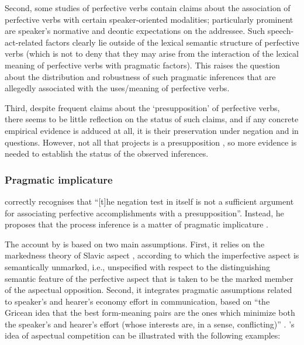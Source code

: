  Second, some studies of perfective verbs \citep[here represented by][]{Paducheva:96, Romanova:06} contain claims about the association of perfective verbs with certain speaker-oriented modalities; particularly prominent are speaker's normative and deontic expectations on the addressee. Such speech-act-related factors clearly lie outside of the lexical semantic structure of perfective verbs (which is not to deny that they may arise from the interaction of the lexical meaning of perfective verbs with pragmatic factors). This raises the question about the distribution and robustness of such pragmatic inferences that are allegedly associated with the uses/meaning of perfective verbs. 

 Third, despite frequent claims about the `presupposition' of perfective verbs, there seems to be little reflection on the status of such claims, and if any concrete empirical evidence is adduced at all, it is their preservation under negation and in questions. However, not all that projects is a presupposition \citep[see, e.g.,][]{ChierchiaMcConnell-Ginet:90, Beaver:01, Potts:05}, so more evidence is needed to establish the status of the observed inferences.

\subsubsection{Pragmatic implicature}
\citet[61]{Gronn:04} correctly recognises that ``[t]he negation test in itself is not a sufficient argument for associating perfective accomplishments with a presupposition''. Instead, he proposes that the process inference is a matter of pragmatic implicature \citep{Grice:75}.

The account by \citet{Gronn:04, Gronn:06} is based on two main assumptions. First, it relies on the markedness theory of Slavic aspect \citep{Maslov:58, Jakobson:71}, according to which the imperfective aspect is semantically unmarked, i.e., unspecified with respect to the distinguishing semantic feature of the perfective
aspect that is taken to be the marked member of the aspectual opposition.
Second, it integrates pragmatic assumptions related to speaker's and hearer's economy effort in communication, based on ``the Gricean idea that the best form-meaning pairs are the ones which minimize both the speaker's and hearer's effort (whose interests are, in a sense, conflicting)'' \citep[][71]{Gronn:06}. \citeauthor{Gronn:06}'s idea of aspectual competition can be illustrated with the following examples:

